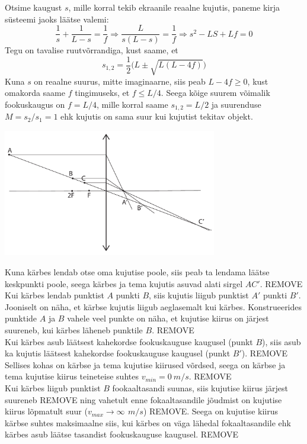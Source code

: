 \documentclass[10pt]{article}
\newcommand{\pp}[1]{REMOVE}
\begin{document}

\solu
Otsime kaugust $s$, mille korral tekib ekraanile reaalne kujutis, paneme kirja süsteemi jaoks läätse valemi:
$$\frac{1}{s}+\frac{1}{L-s}=\frac{1}{f}\Rightarrow \frac{L}{s(L-s)}=\frac{1}{f} \Rightarrow s^2-LS+Lf=0$$
Tegu on tavalise ruutvõrrandiga, kust saame, et $$s_{1,2}=\frac{1}{2}\big(L\pm\sqrt{L(L-4f)}\big)$$
Kuna $s$ on reaalne suurus, mitte imaginaarne, siis peab $L-4f \geq 0$, kust omakorda saame $f$ tingimuseks, et $f \leq L/4$. Seega kõige suurem võimalik fookuskaugus on $f = L/4$, mille korral saame $s_{1,2} = L/2$ ja suurenduse $M=s_2/s_1 = 1$ ehk kujutis on sama suur kui kujutist tekitav objekt.
\probend
\bigskip

\setAuthor{}

\solu
\vspace{-20pt}
  \begin{center}
    \includegraphics[width=0.7\textwidth]{2019-v2g-03-yl.pdf}
  \end{center}
  \vspace{-20pt}


Kuna kärbes lendab otse oma kujutise poole, siis peab ta lendama läätse keskpunkti poole, seega kärbes ja tema kujutis asuvad alati sirgel $AC'$. \pp{1}\\ 
Kui kärbes lendab punktist $A$ punkti $B$, siis kujutis liigub punktist $A'$ punkti $B'$. Jooniselt on näha, et kärbse kujutis liigub aeglasemalt kui kärbes. Konstrueerides punktide $A$ ja $B$ vahele veel punkte on näha, et kujutise kiirus on järjest suureneb, kui kärbes läheneb punktile $B$. \pp{2}\\
Kui kärbes asub läätsest kahekordse fookuskauguse kaugusel (punkt $B$), siis asub ka kujutis läätsest kahekordse fookuskauguse kaugusel (punkt $B'$). \pp{1} Sellises kohas on kärbse ja tema kujutise kiirused võrdsed, seega on kärbse ja tema kujutise kiirus teineteise suhtes $v_{min} = \SI{0}{m/s}$. \pp{1}\\
Kui kärbes liigub punktist $B$ fookaaltasandi suunas, siis kujutise kiirus järjest suureneb \pp{1} ning vahetult enne fokaaltasandile jõudmist on kujutise kiirus lõpmatult suur ($v_{max} \rightarrow \infty\SI{}{\,m/s}$) \pp{1}. Seega on kujutise kiirus kärbse suhtes maksimaalne siis, kui kärbes on väga lähedal fokaaltasandile ehk kärbes asub läätse tasandist fookuskauguse kaugusel. \pp{1}
\probend
\bigskip
\end{document}

